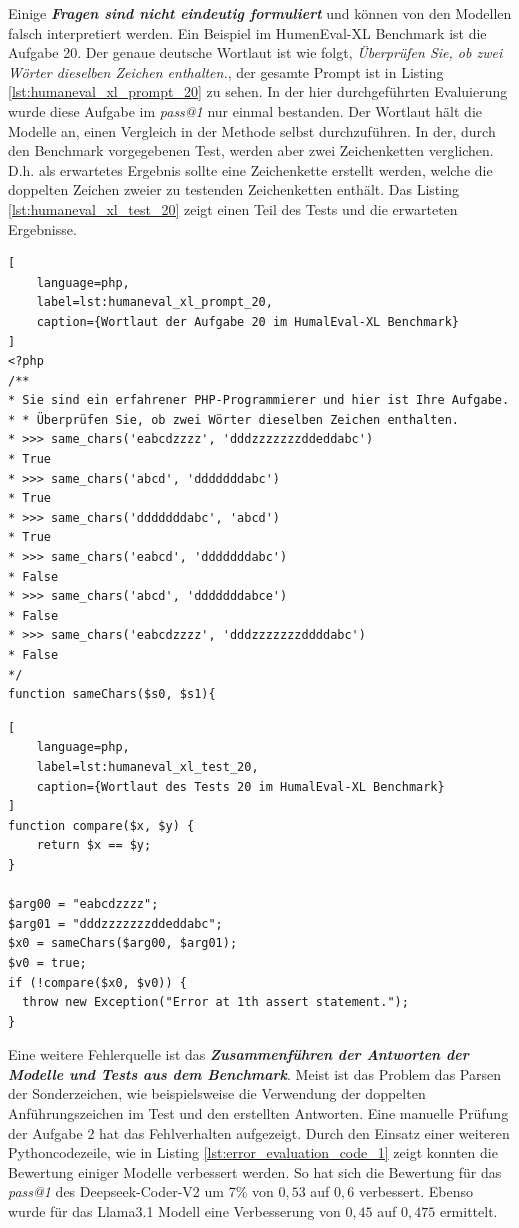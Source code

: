 Einige \textit{\textbf{Fragen sind nicht eindeutig formuliert}} und können von den Modellen falsch interpretiert werden. Ein Beispiel im HumenEval-XL Benchmark ist die Aufgabe 20. Der genaue deutsche Wortlaut ist wie folgt, \textit{Überprüfen Sie, ob zwei Wörter dieselben Zeichen enthalten.}, der gesamte Prompt ist in Listing \ref{lst:humaneval_xl_prompt_20} zu sehen. In der hier durchgeführten Evaluierung wurde diese Aufgabe im \textit{pass@1} nur einmal bestanden. Der Wortlaut hält die Modelle an, einen Vergleich in der Methode selbst durchzuführen. In der, durch den Benchmark vorgegebenen Test, werden aber zwei Zeichenketten verglichen. D.h. als erwartetes Ergebnis sollte eine Zeichenkette erstellt werden, welche die doppelten Zeichen zweier zu testenden Zeichenketten enthält. Das Listing \ref{lst:humaneval_xl_test_20} zeigt einen Teil des Tests und die erwarteten Ergebnisse.\vspace{0.2cm}

\begin{lstlisting}[
	language=php,
	label=lst:humaneval_xl_prompt_20,
	caption={Wortlaut der Aufgabe 20 im HumalEval-XL Benchmark}
]
<?php
/**
* Sie sind ein erfahrener PHP-Programmierer und hier ist Ihre Aufgabe.
* * Überprüfen Sie, ob zwei Wörter dieselben Zeichen enthalten.
* >>> same_chars('eabcdzzzz', 'dddzzzzzzzddeddabc')
* True
* >>> same_chars('abcd', 'dddddddabc')
* True
* >>> same_chars('dddddddabc', 'abcd')
* True
* >>> same_chars('eabcd', 'dddddddabc')
* False
* >>> same_chars('abcd', 'dddddddabce')
* False
* >>> same_chars('eabcdzzzz', 'dddzzzzzzzddddabc')
* False
*/
function sameChars($s0, $s1){
\end{lstlisting}

\begin{lstlisting}[
	language=php,
	label=lst:humaneval_xl_test_20,
	caption={Wortlaut des Tests 20 im HumalEval-XL Benchmark}
]
function compare($x, $y) {
	return $x == $y;
}

$arg00 = "eabcdzzzz";
$arg01 = "dddzzzzzzzddeddabc";
$x0 = sameChars($arg00, $arg01);
$v0 = true;
if (!compare($x0, $v0)) {
  throw new Exception("Error at 1th assert statement.");
}
\end{lstlisting}

Eine weitere Fehlerquelle ist das \textit{\textbf{Zusammenführen der Antworten der Modelle und Tests aus dem Benchmark}}. Meist ist das Problem das Parsen der Sonderzeichen, wie beispielsweise die Verwendung der doppelten Anführungszeichen im Test und den erstellten Antworten. Eine manuelle Prüfung der Aufgabe 2 hat das Fehlverhalten aufgezeigt. Durch den Einsatz einer weiteren Pythoncodezeile, wie in Listing \ref{lst:error_evaluation_code_1} zeigt konnten die Bewertung einiger Modelle verbessert werden. So hat sich die Bewertung für das \textit{pass@1} des Deepseek-Coder-V2 um 7\% von $0,53$ auf $0,6$ verbessert. Ebenso wurde für das Llama3.1 Modell eine Verbesserung von $0,45$ auf $0,475$ ermittelt.\vspace{0.2cm}

